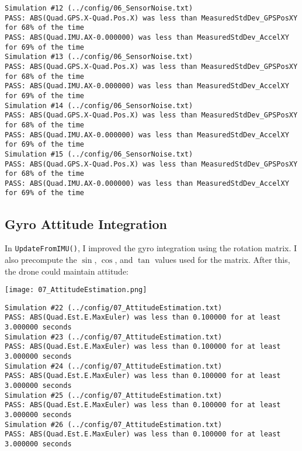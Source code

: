 \documentclass{article}
\begin{document}
\begin{footnotesize}
\begin{verbatim}
Simulation #12 (../config/06_SensorNoise.txt)
PASS: ABS(Quad.GPS.X-Quad.Pos.X) was less than MeasuredStdDev_GPSPosXY for 68% of the time
PASS: ABS(Quad.IMU.AX-0.000000) was less than MeasuredStdDev_AccelXY for 69% of the time
Simulation #13 (../config/06_SensorNoise.txt)
PASS: ABS(Quad.GPS.X-Quad.Pos.X) was less than MeasuredStdDev_GPSPosXY for 68% of the time
PASS: ABS(Quad.IMU.AX-0.000000) was less than MeasuredStdDev_AccelXY for 69% of the time
Simulation #14 (../config/06_SensorNoise.txt)
PASS: ABS(Quad.GPS.X-Quad.Pos.X) was less than MeasuredStdDev_GPSPosXY for 68% of the time
PASS: ABS(Quad.IMU.AX-0.000000) was less than MeasuredStdDev_AccelXY for 69% of the time
Simulation #15 (../config/06_SensorNoise.txt)
PASS: ABS(Quad.GPS.X-Quad.Pos.X) was less than MeasuredStdDev_GPSPosXY for 68% of the time
PASS: ABS(Quad.IMU.AX-0.000000) was less than MeasuredStdDev_AccelXY
for 69% of the time
\end{verbatim}
\end{footnotesize}

\newpage
\subsection{Gyro Attitude Integration}

In \texttt{UpdateFromIMU()}, I improved the gyro integration using the
rotation matrix. I also precompute the $\sin$,
$\cos$, and $\tan$ values used for the matrix. After this, the drone
could maintain attitude:


\begin{center}
    \texttt{[image: 07\_AttitudeEstimation.png]}
\end{center}

\begin{footnotesize}
\begin{verbatim}
Simulation #22 (../config/07_AttitudeEstimation.txt)
PASS: ABS(Quad.Est.E.MaxEuler) was less than 0.100000 for at least 3.000000 seconds
Simulation #23 (../config/07_AttitudeEstimation.txt)
PASS: ABS(Quad.Est.E.MaxEuler) was less than 0.100000 for at least 3.000000 seconds
Simulation #24 (../config/07_AttitudeEstimation.txt)
PASS: ABS(Quad.Est.E.MaxEuler) was less than 0.100000 for at least 3.000000 seconds
Simulation #25 (../config/07_AttitudeEstimation.txt)
PASS: ABS(Quad.Est.E.MaxEuler) was less than 0.100000 for at least 3.000000 seconds
Simulation #26 (../config/07_AttitudeEstimation.txt)
PASS: ABS(Quad.Est.E.MaxEuler) was less than 0.100000 for at least 3.000000 seconds\end{verbatim}
\end{footnotesize}
\end{document}

